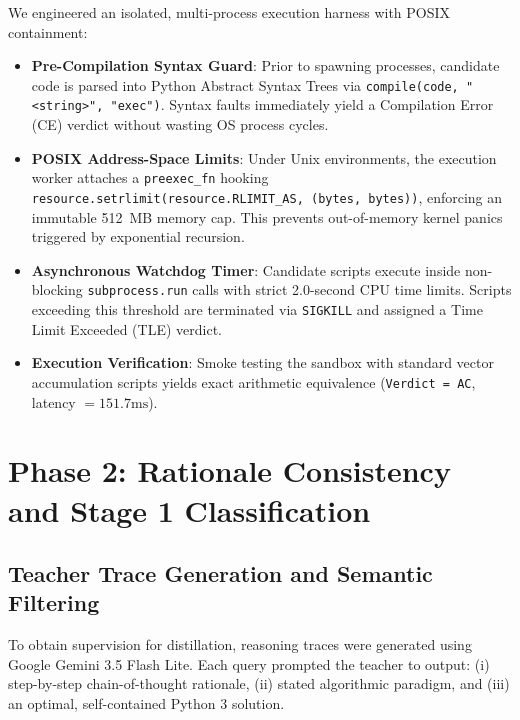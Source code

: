 \documentclass[lettersize,journal]{IEEEtran}
\begin{document}
We engineered an isolated, multi-process execution harness with POSIX containment:
\begin{itemize}
    \item \textbf{Pre-Compilation Syntax Guard}: Prior to spawning processes, candidate code is parsed into Python Abstract Syntax Trees via \texttt{compile(code, "<string>", "exec")}. Syntax faults immediately yield a Compilation Error (CE) verdict without wasting OS process cycles.
    \item \textbf{POSIX Address-Space Limits}: Under Unix environments, the execution worker attaches a \texttt{preexec\_fn} hooking \texttt{resource.setrlimit(resource.RLIMIT\_AS, (bytes, bytes))}, enforcing an immutable 512~MB memory cap. This prevents out-of-memory kernel panics triggered by exponential recursion.
    \item \textbf{Asynchronous Watchdog Timer}: Candidate scripts execute inside non-blocking \texttt{subprocess.run} calls with strict 2.0-second CPU time limits. Scripts exceeding this threshold are terminated via \texttt{SIGKILL} and assigned a Time Limit Exceeded (TLE) verdict.
    \item \textbf{Execution Verification}: Smoke testing the sandbox with standard vector accumulation scripts yields exact arithmetic equivalence (\texttt{Verdict = AC}, latency $= 151.7\text{ms}$).
\end{itemize}

\section{Phase 2: Rationale Consistency and Stage 1 Classification}
\subsection{Teacher Trace Generation and Semantic Filtering}
To obtain supervision for distillation, reasoning traces were generated using Google Gemini 3.5 Flash Lite. Each query prompted the teacher to output: (i) step-by-step chain-of-thought rationale, (ii) stated algorithmic paradigm, and (iii) an optimal, self-contained Python 3 solution.
\end{document}
